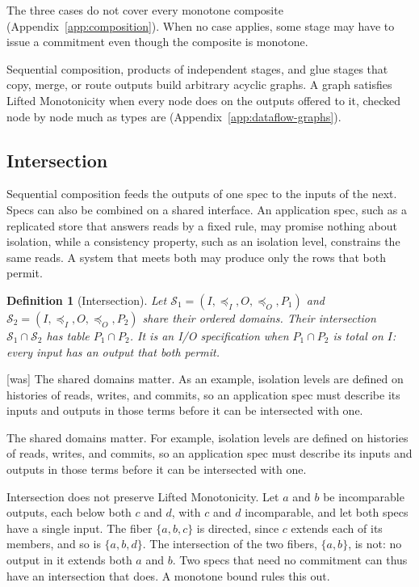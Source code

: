 \documentclass[sigconf]{cidr-2027}
\newtheorem{definition}{Definition}
\theoremstyle{remark}
\newcommand{\InputOrd}{\preceq_I}
\newcommand{\OutputOrd}{\preceq_O}
\newcommand{\commitment}{commitment\xspace}
\newcommand{\outrel}{extends\xspace}          %
\newcommand{\Spec}{\mathcal{S}}
\newcommand{\spectype}[1][]{I/O specification#1\xspace}
\begin{document}
The three cases do not cover every monotone composite
(Appendix~\ref{app:composition}).  When no case applies, some stage may have to issue a \commitment even though the composite is monotone.

Sequential composition, products of independent stages, and glue stages that
copy, merge, or route outputs build arbitrary acyclic graphs.  A graph
satisfies Lifted Monotonicity when every node does on the outputs offered to
it, checked node by node much as types are
(Appendix~\ref{app:dataflow-graphs}).

\subsection{Intersection}
\label{sec:intersection}

Sequential composition feeds the outputs of one spec to the inputs of the
next.  Specs can also be combined on a shared interface.  An application spec,
such as a replicated store that answers reads by a fixed rule, may promise
nothing about isolation, while a consistency property, such as an isolation
level, constrains the same reads.  A system that meets both may produce only
the rows that both permit.

\begin{definition}[Intersection]
\label{def:intersection}
Let $\Spec_1=(I,\InputOrd,O,\OutputOrd,P_1)$ and
$\Spec_2=(I,\InputOrd,O,\OutputOrd,P_2)$ share their ordered domains.  Their
\emph{intersection} $\Spec_1\cap\Spec_2$ has table $P_1\cap P_2$.  It is an
\spectype when $P_1\cap P_2$ is total on $I$: every input has an output that
both permit.
\end{definition}



{\footnotesize\color{black!50}\noindent\textsf{[was]} The shared domains matter.  As an example, isolation levels are defined on
histories of reads, writes, and commits, so an application spec must describe
its inputs and outputs in those terms before it can be intersected with one.\par}

\color{blue!70!black}The shared domains matter.  For example, isolation levels are defined on
histories of reads, writes, and commits, so an application spec must describe
its inputs and outputs in those terms before it can be intersected with one.\color{black}

Intersection does not preserve Lifted Monotonicity.  Let $a$ and $b$ be
incomparable outputs, each below both $c$ and $d$, with $c$ and $d$
incomparable, and let both specs have a single input.  The fiber $\{a,b,c\}$ is
directed, since $c$ \outrel each of its members, and so is $\{a,b,d\}$.  The
intersection of the two fibers, $\{a,b\}$, is not: no output in it \outrel
both $a$ and $b$.  Two specs that need no \commitment can thus have an
intersection that does.  A
monotone bound rules this out.
\end{document}
